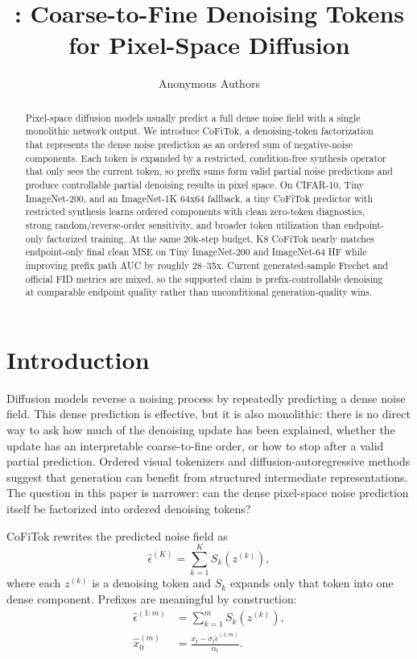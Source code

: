 \documentclass[11pt]{article}
\title{\method: Coarse-to-Fine Denoising Tokens for Pixel-Space Diffusion}
\author{Anonymous Authors}
\date{}
\newcommand{\method}{CoFiTok}
\newcommand{\epshat}{\hat{\epsilon}}
\newcommand{\xt}{x_t}
\begin{document}
\maketitle

\begin{abstract}
Pixel-space diffusion models usually predict a full dense noise field with a
single monolithic network output. We introduce \method, a denoising-token
factorization that represents the dense noise prediction as an ordered sum of
negative-noise components. Each token is expanded by a restricted,
condition-free synthesis operator that only sees the current token, so prefix
sums form valid partial noise predictions and produce controllable partial
denoising results in pixel space. On CIFAR-10, Tiny ImageNet-200, and an
ImageNet-1K 64x64 fallback, a tiny \method{} predictor with restricted synthesis
learns ordered components with clean zero-token diagnostics, strong
random/reverse-order sensitivity, and broader token utilization than
endpoint-only factorized training. At the same 20k-step budget, K8 \method{}
nearly matches endpoint-only final clean MSE on Tiny ImageNet-200 and ImageNet-64 HF
while improving prefix path AUC by roughly 28--35x. Current generated-sample
Frechet and official FID metrics are mixed, so the supported claim is
prefix-controllable denoising at comparable endpoint quality rather than
unconditional generation-quality wins.
\end{abstract}

\section{Introduction}

Diffusion models reverse a noising process by repeatedly predicting a dense
noise field. This dense prediction is effective, but it is also monolithic:
there is no direct way to ask how much of the denoising update has been
explained, whether the update has an interpretable coarse-to-fine order, or how
to stop after a valid partial prediction. Ordered visual tokenizers and
diffusion-autoregressive methods suggest that generation can benefit from
structured intermediate representations. The question in this paper is
narrower: can the dense pixel-space noise prediction itself be factorized into
ordered denoising tokens?

\method{} rewrites the predicted noise field as
\begin{equation}
  \epshat^{(K)} = \sum_{k=1}^{K} S_k\left(z^{(k)}\right),
  \label{eq:full-factorization}
\end{equation}
where each $z^{(k)}$ is a denoising token and $S_k$ expands only
that token into one dense component. Prefixes are meaningful by construction:
\begin{align}
  \epshat^{(1:m)} &= \sum_{k=1}^{m} S_k\left(z^{(k)}\right), \\
  \hat{x}^{(m)}_0 &= \frac{\xt - \sigma_t \epshat^{(1:m)}}{\alpha_t}.
  \label{eq:prefix-denoise}
\end{align}
\end{document}
